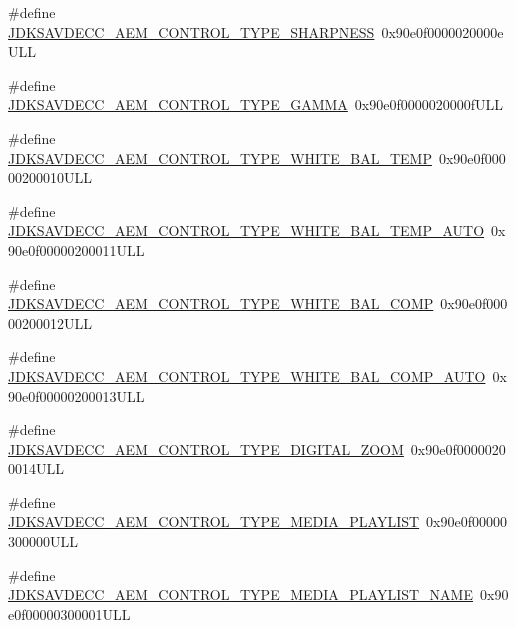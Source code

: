 \begin{DoxyCompactItemize}
\item 
\#define \hyperlink{group__control__type_ga6717c3dca1443424afc75c7f6f05c784}{J\+D\+K\+S\+A\+V\+D\+E\+C\+C\+\_\+\+A\+E\+M\+\_\+\+C\+O\+N\+T\+R\+O\+L\+\_\+\+T\+Y\+P\+E\+\_\+\+S\+H\+A\+R\+P\+N\+E\+SS}~0x90e0f0000020000e\+U\+LL
\item 
\#define \hyperlink{group__control__type_gaf123733e16480a4cb580bc83ab460e63}{J\+D\+K\+S\+A\+V\+D\+E\+C\+C\+\_\+\+A\+E\+M\+\_\+\+C\+O\+N\+T\+R\+O\+L\+\_\+\+T\+Y\+P\+E\+\_\+\+G\+A\+M\+MA}~0x90e0f0000020000f\+U\+LL
\item 
\#define \hyperlink{group__control__type_ga32244b12acc889d12678ce22488739a5}{J\+D\+K\+S\+A\+V\+D\+E\+C\+C\+\_\+\+A\+E\+M\+\_\+\+C\+O\+N\+T\+R\+O\+L\+\_\+\+T\+Y\+P\+E\+\_\+\+W\+H\+I\+T\+E\+\_\+\+B\+A\+L\+\_\+\+T\+E\+MP}~0x90e0f00000200010\+U\+LL
\item 
\#define \hyperlink{group__control__type_ga80354e6b9ef731d528e0bc1ccd47c492}{J\+D\+K\+S\+A\+V\+D\+E\+C\+C\+\_\+\+A\+E\+M\+\_\+\+C\+O\+N\+T\+R\+O\+L\+\_\+\+T\+Y\+P\+E\+\_\+\+W\+H\+I\+T\+E\+\_\+\+B\+A\+L\+\_\+\+T\+E\+M\+P\+\_\+\+A\+U\+TO}~0x90e0f00000200011\+U\+LL
\item 
\#define \hyperlink{group__control__type_ga7e8619b9881316e2798ef943a24eb810}{J\+D\+K\+S\+A\+V\+D\+E\+C\+C\+\_\+\+A\+E\+M\+\_\+\+C\+O\+N\+T\+R\+O\+L\+\_\+\+T\+Y\+P\+E\+\_\+\+W\+H\+I\+T\+E\+\_\+\+B\+A\+L\+\_\+\+C\+O\+MP}~0x90e0f00000200012\+U\+LL
\item 
\#define \hyperlink{group__control__type_gab497994889bda5ae62d724c3adea5c1c}{J\+D\+K\+S\+A\+V\+D\+E\+C\+C\+\_\+\+A\+E\+M\+\_\+\+C\+O\+N\+T\+R\+O\+L\+\_\+\+T\+Y\+P\+E\+\_\+\+W\+H\+I\+T\+E\+\_\+\+B\+A\+L\+\_\+\+C\+O\+M\+P\+\_\+\+A\+U\+TO}~0x90e0f00000200013\+U\+LL
\item 
\#define \hyperlink{group__control__type_ga60521928e4cb7847c135e39aa900e26f}{J\+D\+K\+S\+A\+V\+D\+E\+C\+C\+\_\+\+A\+E\+M\+\_\+\+C\+O\+N\+T\+R\+O\+L\+\_\+\+T\+Y\+P\+E\+\_\+\+D\+I\+G\+I\+T\+A\+L\+\_\+\+Z\+O\+OM}~0x90e0f00000200014\+U\+LL
\item 
\#define \hyperlink{group__control__type_ga0def1e3f995ab161966938a168ad2cd5}{J\+D\+K\+S\+A\+V\+D\+E\+C\+C\+\_\+\+A\+E\+M\+\_\+\+C\+O\+N\+T\+R\+O\+L\+\_\+\+T\+Y\+P\+E\+\_\+\+M\+E\+D\+I\+A\+\_\+\+P\+L\+A\+Y\+L\+I\+ST}~0x90e0f00000300000\+U\+LL
\item 
\#define \hyperlink{group__control__type_gaf998794d6f685934565579d962207bd0}{J\+D\+K\+S\+A\+V\+D\+E\+C\+C\+\_\+\+A\+E\+M\+\_\+\+C\+O\+N\+T\+R\+O\+L\+\_\+\+T\+Y\+P\+E\+\_\+\+M\+E\+D\+I\+A\+\_\+\+P\+L\+A\+Y\+L\+I\+S\+T\+\_\+\+N\+A\+ME}~0x90e0f00000300001\+U\+LL

\end{DoxyCompactItemize}
